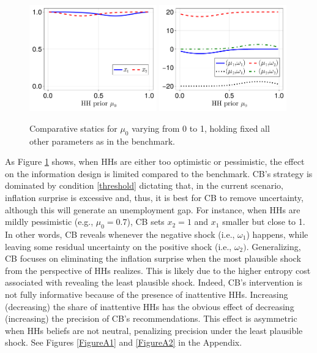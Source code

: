 \documentclass[12pt,a4paper]{article}
\begin{document}
\begin{figure}[H]
\centering
\includegraphics[width=0.49\textwidth]{figures/V8/γ_10/fig_optimal_π_across_μ_0_ω_1_1_ω_2_-1_δ_0.5_.pdf}
\includegraphics[width=0.49\textwidth]{figures/V8/γ_10/fig_posterior_across_μ_0_ω_1_1_ω_2_-1_δ_0.5_.pdf}
\caption{Comparative statics for $\mu_0$ varying from 0 to 1, holding fixed all other parameters as in the benchmark.}
\label{Figure1}
\end{figure}

As Figure \ref{Figure1} shows, when HHs are either too optimistic or pessimistic, the effect on the information design is limited compared to the benchmark. CB's strategy is dominated by condition \eqref{threshold} dictating that, in the current scenario, inflation surprise is excessive and, thus, it is best for CB to remove uncertainty, although this will generate an unemployment gap. For instance, when HHs are mildly pessimistic (e.g., $\mu_0=0.7$), CB sets $x_2=1$ and $x_1$ smaller but close to 1. In other words, CB reveals whenever the negative shock (i.e., $\omega_1$) happens, while leaving some residual uncertainty on the positive shock (i.e., $\omega_2)$. Generalizing, CB focuses on eliminating the inflation surprise when the most plausible shock from the perspective of HHs realizes. This is likely due to the higher entropy cost associated with revealing the least plausible shock. Indeed, CB's intervention is not fully informative because of the presence of inattentive HHs. Increasing (decreasing) the share of inattentive HHs has the obvious effect of decreasing (increasing) the precision of CB's recommendations. This effect is asymmetric when HHs beliefs are not neutral, penalizing precision under the least plausible shock. See Figures \ref{FigureA1} and \ref{FigureA2} in the Appendix.
\end{document}
